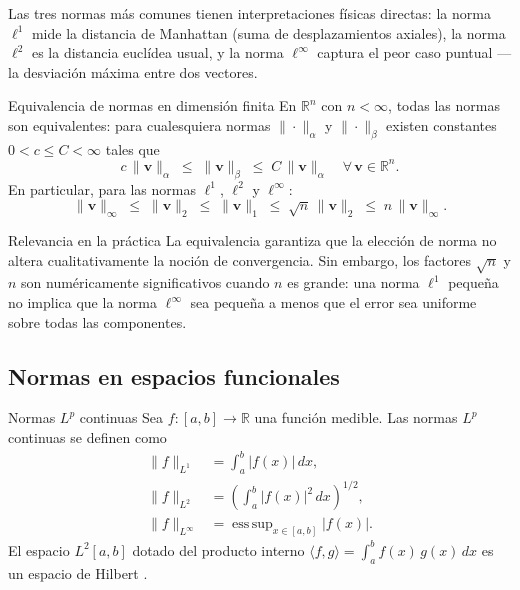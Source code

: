 Las tres normas más comunes tienen interpretaciones físicas directas: la
norma $\ell^1$ mide la distancia de Manhattan (suma de desplazamientos
axiales), la norma $\ell^2$ es la distancia euclídea usual, y la norma
$\ell^\infty$ captura el peor caso puntual —la desviación máxima entre
dos vectores.

\begin{proposicion}{Equivalencia de normas en dimensión finita}
\label{prop:equiv_normas}
En $\mathbb{R}^n$ con $n < \infty$, todas las normas son equivalentes: para
cualesquiera normas $\|\cdot\|_\alpha$ y $\|\cdot\|_\beta$ existen
constantes $0 < c \leq C < \infty$ tales que
\[
  c\,\|\mathbf{v}\|_\alpha \;\leq\; \|\mathbf{v}\|_\beta \;\leq\;
  C\,\|\mathbf{v}\|_\alpha \quad \forall\, \mathbf{v} \in \mathbb{R}^n.
\]
En particular, para las normas $\ell^1$, $\ell^2$ y $\ell^\infty$:
\[
  \|\mathbf{v}\|_\infty \;\leq\; \|\mathbf{v}\|_2 \;\leq\;
  \|\mathbf{v}\|_1 \;\leq\; \sqrt{n}\,\|\mathbf{v}\|_2 \;\leq\;
  n\,\|\mathbf{v}\|_\infty.
\]
\end{proposicion}

\begin{observacion}{Relevancia en la práctica}
La equivalencia garantiza que la elección de norma no altera
cualitativamente la noción de convergencia. Sin embargo, los factores
$\sqrt{n}$ y $n$ son numéricamente significativos cuando $n$ es grande:
una norma $\ell^1$ pequeña no implica que la norma $\ell^\infty$ sea
pequeña a menos que el error sea uniforme sobre todas las componentes.
\end{observacion}

\subsection{Normas en espacios funcionales}
\label{ap:normas_func}

\begin{definicion}{Normas $L^p$ continuas}
\label{def:norma_Lp}
Sea $f : [a,b] \to \mathbb{R}$ una función medible. Las normas $L^p$
continuas se definen como
\begin{align}
  \|f\|_{L^1} &= \int_a^b |f(x)|\,dx, \label{eq:norm_L1_cont}\\[4pt]
  \|f\|_{L^2} &= \left(\int_a^b |f(x)|^2\,dx\right)^{1/2}, \label{eq:norm_L2_cont}\\[4pt]
  \|f\|_{L^\infty} &= \operatorname{ess\,sup}_{x \in [a,b]} |f(x)|. \label{eq:norm_Linf_cont}
\end{align}
El espacio $L^2[a,b]$ dotado del producto interno
$\langle f,g\rangle = \int_a^b f(x)\,g(x)\,dx$
es un espacio de Hilbert \cite{reed1980functional}.
\end{definicion}

